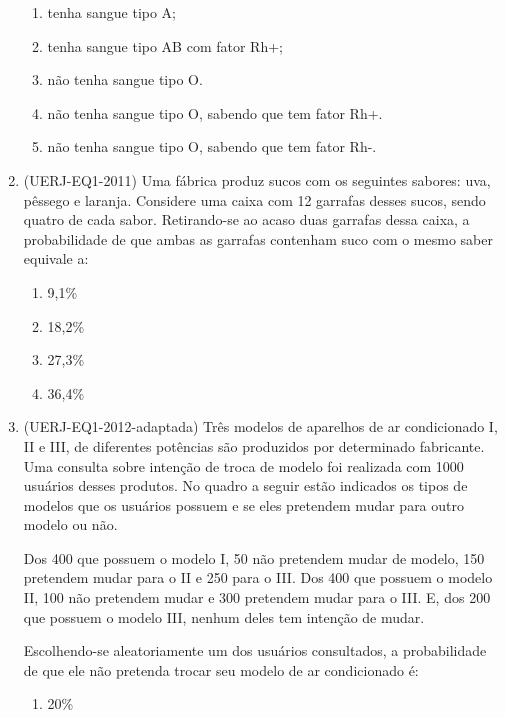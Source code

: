 \begin{enumerate}
\begin{enumerate}
\item {} 
tenha sangue tipo A;

\item {} 
tenha sangue tipo AB com fator Rh+;

\item {} 
não tenha sangue tipo O.

\item {} 
não tenha sangue tipo O, sabendo que tem fator Rh+.

\item {} 
não tenha sangue tipo O, sabendo que tem fator Rh-.

\end{enumerate}

\item (UERJ-EQ1-2011) Uma fábrica produz sucos com os seguintes sabores: uva, pêssego e laranja. Considere uma caixa com 12 garrafas desses sucos, sendo quatro de cada sabor. Retirando-se ao acaso duas garrafas dessa caixa, a probabilidade de que ambas as garrafas contenham suco com o mesmo saber equivale a:
\begin{enumerate}
\item {} 
9,1\%

\item {} 
18,2\%

\item {} 
27,3\%

\item {} 
36,4\%

\end{enumerate}

\item (UERJ-EQ1-2012-adaptada) Três modelos de aparelhos de ar condicionado I, II e III, de diferentes potências são produzidos por determinado fabricante. Uma consulta sobre intenção de troca de modelo foi realizada com 1000 usuários desses produtos. No quadro a seguir estão indicados os tipos de modelos que os usuários possuem e se eles pretendem mudar para outro modelo ou não.

Dos 400 que possuem o modelo I, 50 não pretendem mudar de modelo, 150 pretendem mudar para o II e 250 para o III. Dos 400 que possuem o modelo II, 100 não pretendem mudar e 300 pretendem mudar para o III. E, dos 200 que possuem o modelo III, nenhum deles tem intenção de mudar.

Escolhendo-se aleatoriamente um dos usuários consultados, a probabilidade de que ele não pretenda trocar seu modelo de ar condicionado é:
\begin{enumerate}
\item {} 
20\%


\end{enumerate}
\end{enumerate}
